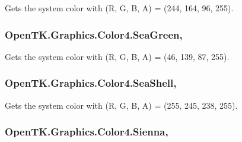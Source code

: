 Gets the system color with (R, G, B, A) = (244, 164, 96, 255). 

\hypertarget{struct_open_t_k_1_1_graphics_1_1_color4_a325f9f125ad6b954aa03a3d828d3ec34}{
\subsubsection[{Sea\-Green}]{ Open\-T\-K.\-Graphics.\-Color4.\-Sea\-Green\hspace{0.3cm}{\ttfamily [static]}, {\ttfamily [get]}}}\label{struct_open_t_k_1_1_graphics_1_1_color4_a325f9f125ad6b954aa03a3d828d3ec34}


Gets the system color with (R, G, B, A) = (46, 139, 87, 255). 

\hypertarget{struct_open_t_k_1_1_graphics_1_1_color4_a379276906d30abe656c1b68679fbe7ef}{
\subsubsection[{Sea\-Shell}]{ Open\-T\-K.\-Graphics.\-Color4.\-Sea\-Shell\hspace{0.3cm}{\ttfamily [static]}, {\ttfamily [get]}}}\label{struct_open_t_k_1_1_graphics_1_1_color4_a379276906d30abe656c1b68679fbe7ef}


Gets the system color with (R, G, B, A) = (255, 245, 238, 255). 

\hypertarget{struct_open_t_k_1_1_graphics_1_1_color4_a9824cec7208b40f90c8e9826bef33c32}{
\subsubsection[{Sienna}]{ Open\-T\-K.\-Graphics.\-Color4.\-Sienna\hspace{0.3cm}{\ttfamily [static]}, {\ttfamily [get]}}}\label{struct_open_t_k_1_1_graphics_1_1_color4_a9824cec7208b40f90c8e9826bef33c32}


